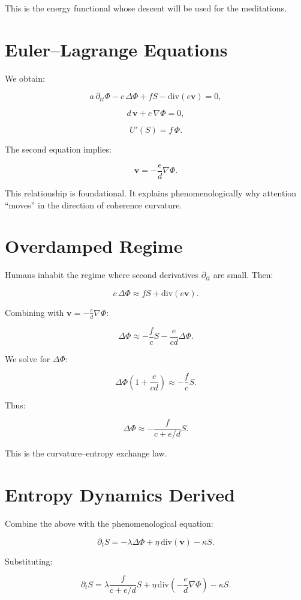 \documentclass[12pt]{article}
\begin{document}
This is the energy functional whose descent will be used for the meditations.

\section{Euler--Lagrange Equations}

We obtain:

\[
a\, \partial_{tt} \Phi
- c\, \Delta \Phi
+ f S
- \mathrm{div}(e \mathbf{v})
= 0,
\]

\[
d\, \mathbf{v}
+ e\, \nabla\Phi
= 0,
\]

\[
U'(S) = f\, \Phi.
\]

The second equation implies:

\[
\mathbf{v} = -\frac{e}{d} \nabla\Phi.
\]

This relationship is foundational.  
It explains phenomenologically why attention “moves” in the direction of coherence curvature.

\section{Overdamped Regime}

Humans inhabit the regime where second derivatives $\partial_{tt}$ are small.
Then:

\[
c\, \Delta \Phi \approx f S + \mathrm{div}(e\mathbf{v}).
\]

Combining with $\mathbf{v} = -\frac{e}{d} \nabla\Phi$:

\[
\Delta\Phi
\approx
-\frac{f}{c} S
- \frac{e}{c d}\Delta\Phi.
\]

We solve for $\Delta\Phi$:

\[
\Delta\Phi
\left(1 + \frac{e}{cd}\right)
\approx
-\frac{f}{c} S.
\]

Thus:

\[
\Delta\Phi
\approx
-\frac{f}{c + e/d} S.
\]

This is the curvature--entropy exchange law.

\section{Entropy Dynamics Derived}

Combine the above with the phenomenological equation:

\[
\partial_t S
= -\lambda \Delta\Phi
+ \eta\,\mathrm{div}(\mathbf{v})
- \kappa S.
\]

Substituting:

\[
\partial_t S
= \lambda \frac{f}{c + e/d} S
+ \eta\, \mathrm{div}\!\left(-\frac{e}{d} \nabla\Phi\right)
- \kappa S.
\]
\end{document}
